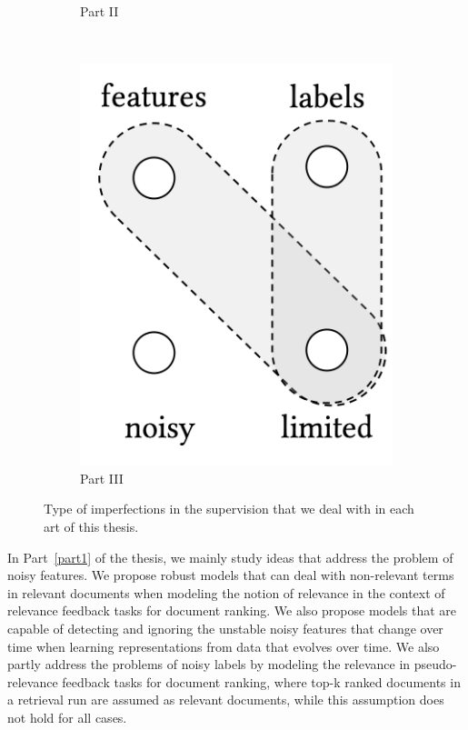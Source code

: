 \begin{figure}[t]
\begin{subfigure}[b]{0.32\textwidth}
        \caption{\label{fig:p2}Part II}
    \end{subfigure}
        ~ 
    \begin{subfigure}[b]{0.32\textwidth}
    \centering
        \includegraphics[width=0.55\linewidth]{01-introduction/figs_and_tables/fig_p3.png}
        \caption{\label{fig:p3}Part III}
    \end{subfigure}
\caption{\label{fig:thesis_parts}Type of imperfections in the supervision that we deal with in each art of this thesis.}
\end{figure}

In Part~\ref{part1} of the thesis, we mainly study ideas that address the problem of noisy features. We propose robust models that can deal with non-relevant terms in relevant documents when modeling the notion of relevance in the context of relevance feedback tasks for document ranking. We also propose models that are capable of detecting and ignoring the unstable noisy features that change over time when learning representations from data that evolves over time. We also partly address the problems of noisy labels by modeling the relevance in pseudo-relevance feedback tasks for document ranking, where top-k ranked documents in a retrieval run are assumed as relevant documents, while this assumption does not hold for all cases.


